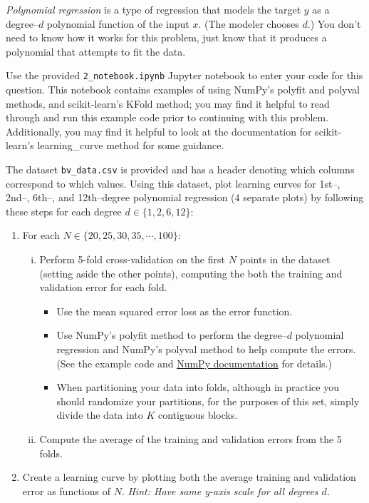 \emph{Polynomial regression} is a type of regression that models the target $y$ as a degree--$d$ polynomial function of the input $x$. (The modeler chooses $d$.)  You don't need to know how it works for this problem, just know that it produces a polynomial that attempts to fit the data.

\begin{problem}[14]
    Use the provided \texttt{2_notebook.ipynb} Jupyter notebook to enter your code for this question. This notebook contains examples of using NumPy's polyfit and polyval methods, and scikit-learn's KFold method; you may find it helpful to read through and run this example code prior to continuing with this problem. Additionally, you may find it helpful to look at the documentation for scikit-learn's learning_curve method for some guidance.

The dataset \texttt{bv_data.csv} is provided and has a header denoting which columns correspond to which values. Using this dataset, plot learning curves for 1st--, 2nd--, 6th--, and 12th--degree polynomial regression (4 separate plots) by following these steps for each degree $d \in \{1, 2, 6, 12\}$:

  \begin{enumerate}
    \item For each $N \in \{20, 25, 30, 35, \cdots, 100\}$:
    \begin{enumerate}[i.]
      \item Perform 5-fold cross-validation on the first $N$ points in the dataset (setting aside the other points), computing the both the training and validation error for each fold. 
      \begin{itemize}
        \item Use the mean squared error loss as the error function.
        \item Use NumPy's polyfit method to perform the degree--$d$ polynomial regression and NumPy's polyval method to help compute the errors.  (See the example code and \href{https://docs.scipy.org/doc/NumPy/reference/routines.polynomials.poly1d.html}{NumPy documentation} for details.)
        \item When partitioning your data into folds, although in practice you should randomize your partitions, for the purposes of this set, simply divide the data into $K$ contiguous blocks.
      \end{itemize}
      \item Compute the average of the training and validation errors from the 5 folds.
    \end{enumerate}
    \item Create a learning curve by plotting both the average training and validation error as functions of $N$. \textit{Hint: Have same y-axis scale for all degrees $d$.}
  \end{enumerate}

\end{problem}
\begin{solution}
  \end{solution}


